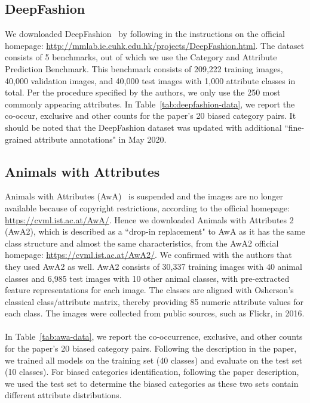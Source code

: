 \subsection{DeepFashion}
We downloaded DeepFashion~\cite{liuLQWTcvpr16DeepFashion} by following in the instructions on the official homepage: \url{http://mmlab.ie.cuhk.edu.hk/projects/DeepFashion.html}. The dataset consists of 5 benchmarks, out of which we use the Category and Attribute Prediction Benchmark. This benchmark consists of 209,222 training images, 40,000 validation images, and 40,000 test images with 1,000 attribute classes in total. Per the procedure specified by the authors, we only use the 250 most commonly appearing attributes. In Table~\ref{tab:deepfashion-data}, we report the co-occur, exclusive and other counts for the paper's 20 biased category pairs. It should be noted that the DeepFashion dataset was updated with additional ``fine-grained attribute annotations" in May 2020.

\subsection{Animals with Attributes}
Animals with Attributes (AwA)~\cite{AwA} is suspended and the images are no longer available because of copyright restrictions, according to the official homepage: \url{https://cvml.ist.ac.at/AwA/}. Hence we downloaded Animals with Attributes 2 (AwA2), which is described as a ``drop-in replacement" to AwA as it has the same class structure and almost the same characteristics, from the AwA2 official homepage: \url{https://cvml.ist.ac.at/AwA2/}. We confirmed with the authors that they used AwA2 as well. AwA2 consists of 30,337 training images with 40 animal classes and 6,985 test images with 10 other animal classes, with pre-extracted feature representations for each image. The classes are aligned with Osherson's classical class/attribute matrix, thereby providing 85 numeric attribute values for each class. The images were collected from public sources, such as Flickr, in 2016.\\
\\
In Table~\ref{tab:awa-data}, we report the co-occurrence, exclusive, and other counts for the paper's 20 biased category pairs. Following the description in the paper, we trained all models on the training set (40 classes) and evaluate on the test set (10 classes). 
For biased categories identification, following the paper description, we used the test set to determine the biased categories as these two sets contain different attribute distributions.

